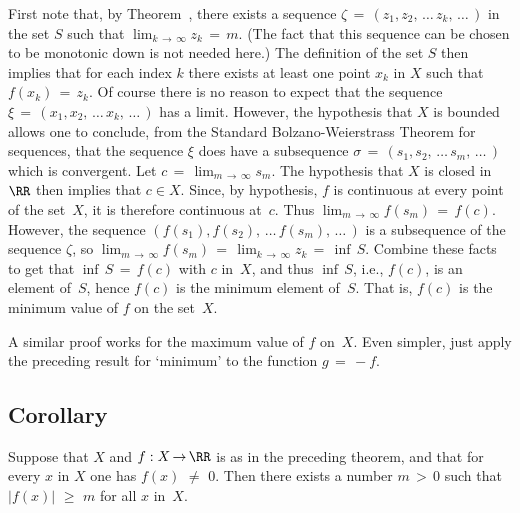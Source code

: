     First note that, by Theorem~, there exists a sequence ${\zeta} \,=\, (z_{1}, z_{2},\,{\ldots}\,z_{k},\,{\ldots}\,)$
    in the set $S$ such that $\lim_{k \,{\rightarrow}\, {\infty}} z_{k} \,=\, m$.
    (The fact that this sequence can be chosen to be monotonic down is not needed here.)
    The definition of the set $S$ then implies that for each index $k$ there exists at least one point $x_{k}$ in $X$ such that $f(x_{k}) \,=\, z_{k}$.
    Of course there is no reason to expect that the sequence ${\xi} \,=\, (x_{1}, x_{2},\,{\ldots}\,x_{k},\,{\ldots}\,)$ has a limit.
    However, the hypothesis that $X$ is bounded allows one to conclude, from the Standard Bolzano-Weierstrass Theorem for sequences,
    that the sequence ${\xi}$ does have a subsequence ${\sigma} \,=\, (s_{1}, s_{2},\,{\ldots}\,s_{m},\,{\ldots}\,)$ which is convergent.
    Let $c \,=\, \lim_{m \,{\rightarrow}\, {\infty}} s_{m}$. The hypothesis that $X$ is closed in~${\RR}$ then implies that $c{\in}X$.
    Since, by hypothesis, $f$ is continuous at every point of the set~$X$, it is therefore continuous at~$c$.
    Thus $\lim_{m \,{\rightarrow}\, {\infty}} f(s_{m}) \,=\, f(c)$. However, the sequence $(f(s_{1}), f(s_{2}),\,{\ldots}\,f(s_{m}),\,{\ldots}\,)$
    is a subsequence of the sequence ${\zeta}$,
    so $\lim_{m \,{\rightarrow}\, {\infty}} f(s_{m}) \,=\, \lim_{k \,{\rightarrow}\, {\infty}} z_{k} \,=\, {\inf}\,S$.
    Combine these facts to get that ${\inf}\,S \,=\, f(c)$ with $c$ in~$X$, and thus ${\inf}\,S$, i.e., $f(c)$,
    is an element of~$S$, hence $f(c)$ is the minimum element of~$S$. That is, $f(c)$ is the minimum value of $f$ on the set~$X$.

        A similar proof works for the maximum value of $f$ on~$X$. Even simpler, just apply the preceding result for `minimum' to the function $g \,=\, -f$.
    

\V%

            \subsection{\small{\bf Corollary}}
            \label{CorD30.20}

\V

        Suppose that $X$ and $f:X \,{\rightarrow}\, {\RR}$ is as in the preceding theorem,
    and that for every $x$ in $X$ one has $f(x) \,\,{\neq}\,\, 0$. Then there exists a number $m\,>\,0$ such that $|f(x)|\,\,{\geq}\,\,m$ for all $x$ in~$X$.

